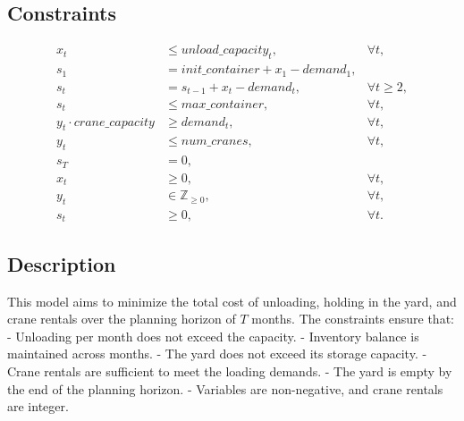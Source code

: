 \documentclass{article}
\begin{document}
\subsection*{Constraints}
\begin{align*}
x_t &\leq unload\_capacity_t, & \forall t, \\
s_1 &= init\_container + x_1 - demand_1, \\
s_t &= s_{t-1} + x_t - demand_t, & \forall t \geq 2, \\
s_t &\leq max\_container, & \forall t, \\
y_t \cdot crane\_capacity &\geq demand_t, & \forall t, \\
y_t &\leq num\_cranes, & \forall t, \\
s_T &= 0, \\
x_t &\geq 0, & \forall t, \\
y_t &\in \mathbb{Z}_{\geq 0}, & \forall t, \\
s_t &\geq 0, & \forall t.
\end{align*}

\subsection*{Description}
This model aims to minimize the total cost of unloading, holding in the yard, and crane rentals over the planning horizon of $T$ months. The constraints ensure that:
- Unloading per month does not exceed the capacity.
- Inventory balance is maintained across months.
- The yard does not exceed its storage capacity.
- Crane rentals are sufficient to meet the loading demands.
- The yard is empty by the end of the planning horizon.
- Variables are non-negative, and crane rentals are integer.
\end{document}
